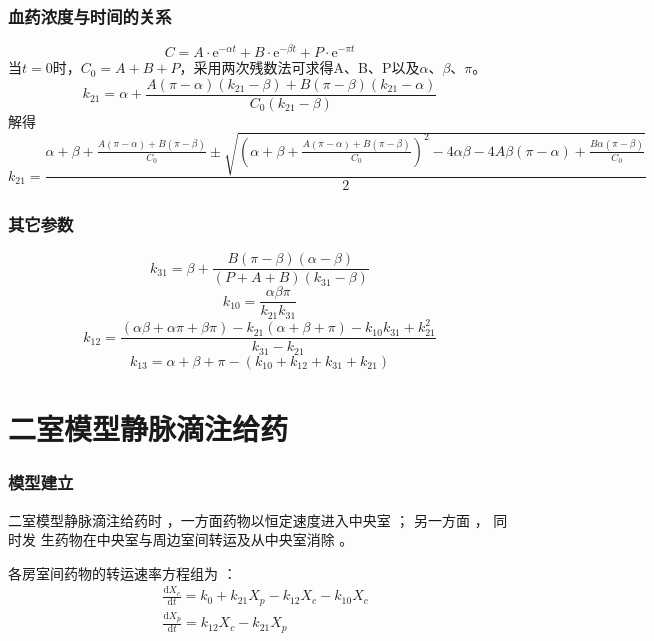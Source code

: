 \documentclass[dvipsnames, svgnames, x11names]{beamer}
\begin{document}
\begin{frame}
    \frametitle{血药浓度与时间的关系}
    \[
        C = A\cdot \mathrm{e}^{-\alpha t} + B\cdot \mathrm{e}^{-\beta t} + P\cdot \mathrm{e}^{-\pi t}
    \]
    当$t=0$时，$C_0 = A+B+P$，采用两次残数法可求得A、B、P以及$\alpha$、$\beta$、$\pi$。
    \[
        k_{21} = \alpha + \frac{A(\pi - \alpha)(k_{21} - \beta) + B(\pi - \beta)(k_{21} - \alpha)}{C_0(k_{21} - \beta)}
    \]
    解得
    {\small
    \[
        k_{21} = \frac{\alpha + \beta + \frac{A(\pi - \alpha)+ B(\pi - \beta)}{C_0} \pm \sqrt{\left(\alpha + \beta + \frac{A(\pi - \alpha)+ B(\pi - \beta)}{C_0}\right)^2 - 4\alpha \beta - 4A\beta(\pi - \alpha) + \frac{B\alpha(\pi - \beta)}{C_0}}}{2}
    \]}
\end{frame}


\begin{frame}
    \frametitle{其它参数}
    \[
        k_{31}={\beta}+\frac{{B}({\pi}-{\beta})({\alpha}-{\beta})}{({P}+{A}+{B})({k}_{31}-{\beta})}
    \]
    \[
        k_{10}=\frac{{\alpha}{\beta}{\pi}}{{k}_{21}{k}_{31}}
    \]
    \[
        k_{12}=\frac{({\alpha}{\beta}+{\alpha}\pi+{\beta}\pi)-{k}_{21}({\alpha}+{\beta}+{\pi})-{k}_{10}{k}_{31}+{k}_{21}^{2}}{{k}_{31}-{k}_{21}}
    \]
    \[
        k_{13}={\alpha}+{\beta}+{\pi}-({k}_{10}+{k}_{12}+{k}_{31}+{k}_{21})
    \]
\end{frame}


\section{二室模型静脉滴注给药}


\begin{frame}
    \frametitle{模型建立}
    二室模型静脉滴注给药时 ，一方面药物以恒定速度进入中央室 ； 另一方面 ， 同时发
    生药物在中央室与周边室间转运及从中央室消除 。 

    \begin{center}
    \end{center}

    各房室间药物的转运速率方程组为 ：
    \[
        \begin{aligned}
            &\frac{\mathrm{d}X_{c}}{\mathrm{d}t} =k_0 + k_{21}X_{p}-k_{{12}}X_{c}-k_{{10}}X_{c}  \\
            &\frac{\mathrm{d}X_{p}}{\mathrm{d}t} =k_{{12}}X_{c}-k_{{21}}X_{p} 
        \end{aligned}
    \]
\end{frame}
\end{document}
